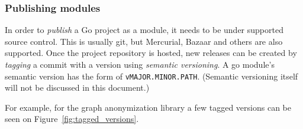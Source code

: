 \subsubsection{Publishing modules}

In order to \emph{publish} a Go project as a module, it needs to be under supported source control. This is usually git, but Mercurial, Bazaar and others are also supported\cite{publish-go-modules}. Once the project repository is hosted, new releases can be created by \emph{tagging} a commit with a version using \emph{semantic versioning}. A go module's semantic version has the form of \texttt{vMAJOR.MINOR.PATH}. (Semantic versioning itself will not be discussed in this document.)

For example, for the graph anonymization library a few tagged versions can be seen on Figure~\ref{fig:tagged_versions}.
